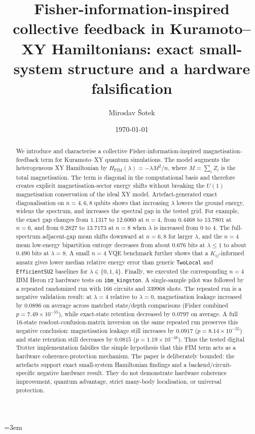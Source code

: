\documentclass[preprint,aps,physrev,superscriptaddress,floatfix,longbibliography]{revtex4-2}
\begin{document}
\emergencystretch=3em

\title{Fisher-information-inspired collective feedback in Kuramoto--XY
Hamiltonians: exact small-system structure and a hardware falsification}

\author{Miroslav \v{S}otek}

\date{\today}

\begin{abstract}
We introduce and characterise a collective Fisher-information-inspired
magnetisation-feedback term for Kuramoto--XY quantum simulations. The model
augments the heterogeneous XY Hamiltonian by
$H_{\mathrm{FIM}}(\lambda)=-\lambda M^2/n$, where
$M=\sum_i Z_i$ is the total magnetisation. The term is diagonal in the
computational basis and therefore creates explicit magnetisation-sector energy
shifts without breaking the $U(1)$ magnetisation conservation of the ideal XY
model. Artefact-generated exact diagonalisation on $n=4,6,8$ qubits shows that
increasing $\lambda$ lowers the ground energy, widens the spectrum, and
increases the spectral gap in the tested grid. For example, the exact gap
changes from $1.1317$ to $12.6060$ at $n=4$, from $0.4468$ to $13.7801$ at
$n=6$, and from $0.2827$ to $13.7173$ at $n=8$ when $\lambda$ is increased
from $0$ to $4$. The full-spectrum adjacent-gap mean shifts downward at
$n=6,8$ for larger $\lambda$, and the $n=4$ mean low-energy bipartition
entropy decreases from about $0.676$ bits at $\lambda\leq 1$ to about
$0.490$ bits at $\lambda=8$. A small $n=4$ VQE benchmark further shows that a
$K_{ij}$-informed ansatz gives lower median relative energy error than generic
\texttt{TwoLocal} and \texttt{EfficientSU2} baselines for
$\lambda\in\{0,1,4\}$. Finally, we executed the corresponding $n=4$ IBM Heron
r2 hardware tests on \texttt{ibm\_kingston}. A single-sample pilot was followed
by a repeated randomized run with 166 circuits and 339968 shots. The repeated
run is a negative validation result: at $\lambda=4$ relative to $\lambda=0$,
magnetisation leakage increased by $0.0896$ on average across matched
state/depth comparisons (Fisher combined $p=7.49\times10^{-55}$), while
exact-state retention decreased by $0.0797$ on average. A full 16-state
readout-confusion-matrix inversion on the same repeated run preserves this
negative conclusion: magnetisation leakage still increases by $0.0917$
($p=8.14\times10^{-55}$) and state retention still decreases by $0.0815$
($p=1.19\times10^{-48}$). Thus the tested digital
Trotter implementation falsifies the simple hypothesis that this FIM term acts
as a hardware coherence-protection mechanism. The paper is deliberately
bounded: the artefacts support exact small-system Hamiltonian findings and a
backend/circuit-specific negative hardware result. They do not demonstrate
hardware coherence improvement, quantum advantage, strict many-body
localisation, or universal protection.
\end{abstract}
\end{document}
